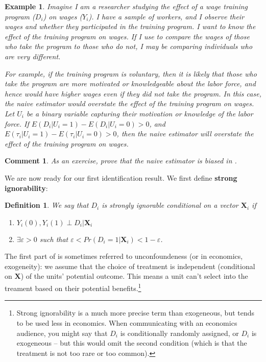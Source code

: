 \documentclass{tufte-handout}
\theoremstyle{break}
\newtheorem{defN}{Definition}
\newtheorem{exmp}{Example}
\newtheorem{cmt}{Comment}
\newcommand{\bX}{\mathbf{X}}
\begin{document}
\begin{boxD}
  \begin{exmp}
    \label{ex:example2}
    Imagine I am a researcher studying the effect of a wage training program ($D_{i}$) on wages ($Y_{i}$). I have a sample of workers, and I observe their wages and whether they participated in the training program. I want to know the effect of the training program on wages. If I use  to compare the wages of those who take the program to those who do not, I may be comparing individuals who are very different. 
    \linebreak

    For example, if the training program is voluntary, then it is likely that those who take the program are more motivated or knowledgeable about the labor force, and hence would have higher wages even if they did not take the program. In this case, the naive estimator would overstate the effect of the training program on wages. Let $U_{i}$ be a binary variable capturing their motivation or knowledge of the labor force. If $E(D_{i} | U_{i} = 1) - E(D_{i} | U_{i} = 0)  > 0$, and $E(\tau_{i} | U_{i} = 1) - E(\tau_{i} | U_{i} = 0)  > 0$, then the naive estimator will overstate the effect of the training program on wages.
  \end{exmp}
\end{boxD}

\begin{boxF}
  \begin{cmt}
    As an exercise, prove that the naive estimator is biased in .
    \end{cmt}
  \end{boxF}

We are now ready for our first identification result. We first define \textbf{strong ignorability}:
\begin{defN}
  \label{def:strong_ignorability}
  We say that $D_{i}$ is strongly ignorable conditional on a vector $\bX_{i}$ if
  \begin{enumerate}
\item     $Y_{i}(0), Y_{i}(1) \perp D_{i} | \bX_{i}$
\item $\exists \varepsilon > 0$ such that $\varepsilon < Pr(D_{i} = 1 | \bX_{i}) < 1-\varepsilon$.
  \end{enumerate}
\end{defN}
The first part of  is sometimes referred to unconfoundeness (or in economics, exogeneity): we assume that the choice of treatment is independent (conditional on $\bX$) of the units' potential outcome. This means a unit can't select into the treament based on their potential benefits.\footnote{Strong ignorability is a much more precise term than exogeneous, but tends to be used less in economics. When communicating with an economics audience, you might say that $D_{i}$ is conditionally randomly assigned, or $D_{i}$ is exogeneous -- but this would omit the second condition (which is that the treatment is not too rare or too common).}
\end{document}
